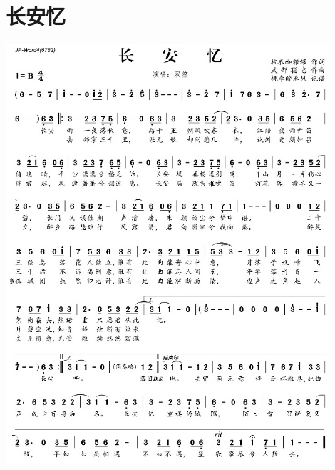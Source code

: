 \documentclass[cn,pad,twocol]{elegantbook}
\begin{document}
\section{长安忆} \includegraphics[width=0.9\textwidth]{rpi400/20210123-长安忆.jpg}
\end{document}
